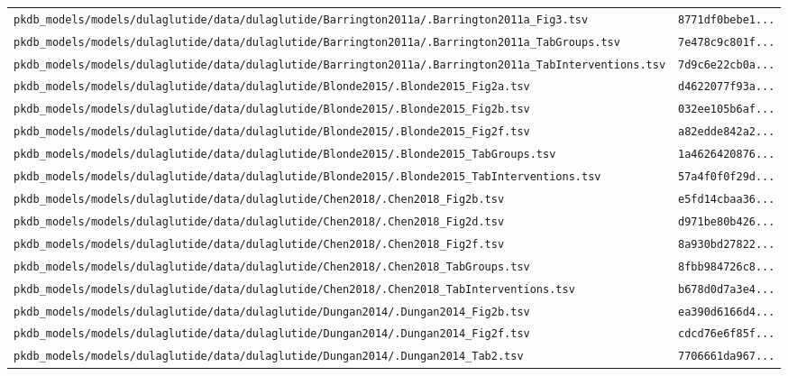 \documentclass{article}
\begin{document}
\begin{longtable}{ll}
\texttt{pkdb\_models/models/dulaglutide/data/dulaglutide/Barrington2011a/.Barrington2011a\_Fig3.tsv} & \texttt{8771df0bebe1...} \\
\texttt{pkdb\_models/models/dulaglutide/data/dulaglutide/Barrington2011a/.Barrington2011a\_TabGroups.tsv} & \texttt{7e478c9c801f...} \\
\texttt{pkdb\_models/models/dulaglutide/data/dulaglutide/Barrington2011a/.Barrington2011a\_TabInterventions.tsv} & \texttt{7d9c6e22cb0a...} \\
\texttt{pkdb\_models/models/dulaglutide/data/dulaglutide/Blonde2015/.Blonde2015\_Fig2a.tsv} & \texttt{d4622077f93a...} \\
\texttt{pkdb\_models/models/dulaglutide/data/dulaglutide/Blonde2015/.Blonde2015\_Fig2b.tsv} & \texttt{032ee105b6af...} \\
\texttt{pkdb\_models/models/dulaglutide/data/dulaglutide/Blonde2015/.Blonde2015\_Fig2f.tsv} & \texttt{a82edde842a2...} \\
\texttt{pkdb\_models/models/dulaglutide/data/dulaglutide/Blonde2015/.Blonde2015\_TabGroups.tsv} & \texttt{1a4626420876...} \\
\texttt{pkdb\_models/models/dulaglutide/data/dulaglutide/Blonde2015/.Blonde2015\_TabInterventions.tsv} & \texttt{57a4f0f0f29d...} \\
\texttt{pkdb\_models/models/dulaglutide/data/dulaglutide/Chen2018/.Chen2018\_Fig2b.tsv} & \texttt{e5fd14cbaa36...} \\
\texttt{pkdb\_models/models/dulaglutide/data/dulaglutide/Chen2018/.Chen2018\_Fig2d.tsv} & \texttt{d971be80b426...} \\
\texttt{pkdb\_models/models/dulaglutide/data/dulaglutide/Chen2018/.Chen2018\_Fig2f.tsv} & \texttt{8a930bd27822...} \\
\texttt{pkdb\_models/models/dulaglutide/data/dulaglutide/Chen2018/.Chen2018\_TabGroups.tsv} & \texttt{8fbb984726c8...} \\
\texttt{pkdb\_models/models/dulaglutide/data/dulaglutide/Chen2018/.Chen2018\_TabInterventions.tsv} & \texttt{b678d0d7a3e4...} \\
\texttt{pkdb\_models/models/dulaglutide/data/dulaglutide/Dungan2014/.Dungan2014\_Fig2b.tsv} & \texttt{ea390d6166d4...} \\
\texttt{pkdb\_models/models/dulaglutide/data/dulaglutide/Dungan2014/.Dungan2014\_Fig2f.tsv} & \texttt{cdcd76e6f85f...} \\
\texttt{pkdb\_models/models/dulaglutide/data/dulaglutide/Dungan2014/.Dungan2014\_Tab2.tsv} & \texttt{7706661da967...} \\

\end{longtable}
\end{document}
